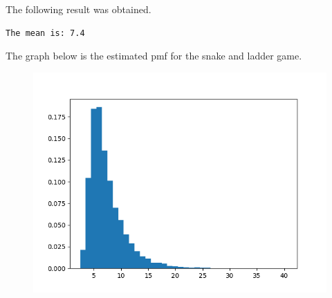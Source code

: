\documentclass{article}
\begin{document}
The following result was obtained.
\begin{verbatim}
The mean is: 7.4
\end{verbatim}

The graph below is the estimated pmf for the snake and ladder game.
\begin{figure}[H]
    \centering
    \includegraphics[width=5in]{graph2.png}
\end{figure}
\end{document}
